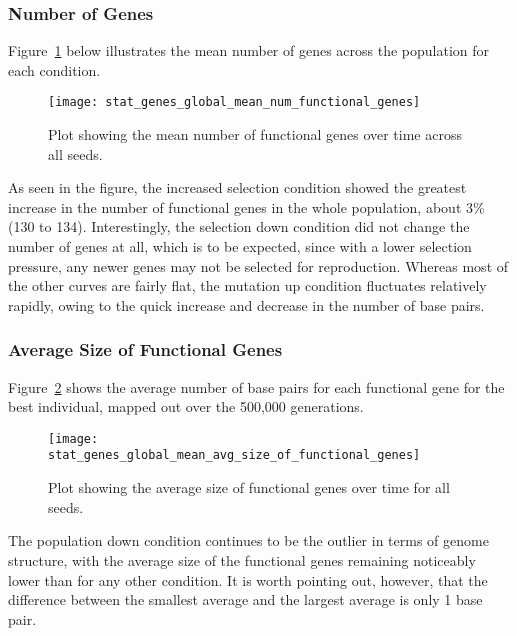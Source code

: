 \subsubsection{Number of Genes}\label{sec:number_of_functional_genes}
Figure~\ref{fig:mean_num_functional_genes} below illustrates the mean number of genes across the population for each condition.  
\begin{figure}[H]
	\centering
	\texttt{[image: stat\_genes\_global\_mean\_num\_functional\_genes]}
	\caption[Mean number of functional genes]{Plot showing the mean number of functional genes over time across all seeds.}
	\label{fig:mean_num_functional_genes}
\end{figure}
As seen in the figure, the increased selection condition showed the greatest increase in the number of functional genes in the whole population, about 3\% (130 to 134). Interestingly, the selection down condition did not change the number of genes at all, which is to be expected, since with a lower selection pressure, any newer genes may not be selected for reproduction. Whereas most of the other curves are fairly flat, the mutation up condition fluctuates relatively rapidly, owing to the quick increase and decrease in the number of base pairs. 

\subsubsection{Average Size of Functional Genes}\label{sec:average_size_functional_genes}
Figure~\ref{fig:mean_functional_gene_size} shows the average number of base pairs for each functional gene for the best individual, mapped out over the 500,000 generations. 
\begin{figure}[H]
	\centering
	\texttt{[image: stat\_genes\_global\_mean\_avg\_size\_of\_functional\_genes]}
	\caption[Average size of functional genes]{Plot showing the average size of functional genes over time for all seeds.}
	\label{fig:mean_functional_gene_size}
\end{figure}
The population down condition continues to be the outlier in terms of genome structure, with the average size of the functional genes remaining noticeably lower than for any other condition. It is worth pointing out, however, that the difference between the smallest average and the largest average is only 1 base pair. 

